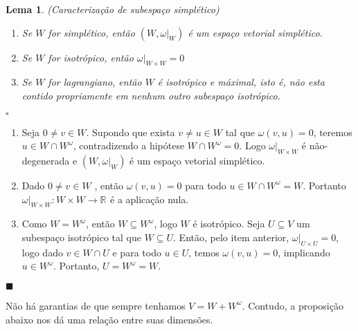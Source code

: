 \documentclass[12pt]{book}
\newtheorem{lema}[teorema]{Lema}
\newenvironment{prova}[1]{$\square$ #1}{\hfill$\blacksquare$}
\newcommand{\espacoSimpleticoOrtogonal}[1]{#1^{\omega}}
\newcommand{\real}[1]{\mathbb{R}^{#1}}
\newcommand{\reta}{\real{}}
\begin{document}
	\begin{lema}\label{lema_subespaco_simpletico_ortogonal}
		(Caracterização de subespaço simplético)
		\begin{enumerate}
			\item Se $W$ for simplético, então $(W, \omega|_{W})$ é um espaço vetorial simplético.
			
			\item Se $W$ for isotrópico, então $\omega|_{W\times W} = 0$
			
			\item Se $W$ for lagrangiano, então $W$ é isotrópico e máximal, isto é, não esta contido propriamente em nenhum outro subespaço isotrópico. 
		\end{enumerate}
	\end{lema}
	\begin{prova}
		\begin{enumerate}
			\item Seja $0\neq v \in W$. Supondo que exista $v\neq u \in W$ tal que $\omega(v, u ) = 0$, teremos $u \in W\cap W^{\omega}$, contradizendo a hipótese $W\cap W^{\omega} =0$. Logo $\omega|_{W \times W} $ é não-degenerada e $(W, \omega|_{W})$ é um espaço vetorial simplético.
			
			\item Dado $0\neq v \in W $ , então $\omega(v,u) = 0$ para todo $u \in W\cap W^{\omega} = W$. Portanto $\omega|_{W\times W}: W\times W \to \reta$ é a aplicação nula.
			
			\item  Como $W=W^{\omega}$, então $W\subseteq W^{\omega}$, logo $W$ é isotrópico. Seja $U \subseteq V$ um subespaço isotrópico tal que $W \subseteq U$. Então, pelo item anterior, $\omega|_{U\times U} = 0$, logo dado $v \in W \cap U$ e para todo $u \in U$, temos $\omega(v, u) = 0$, implicando $u \in W^{\omega}$. Portanto, $U = W^{\omega} = W$.
		\end{enumerate}
	\end{prova}
	
	Não há garantias de que sempre tenhamos $V = W + \espacoSimpleticoOrtogonal{W}$. Contudo, a proposição abaixo nos dá uma relação entre suas dimensões.
	
\end{document}
